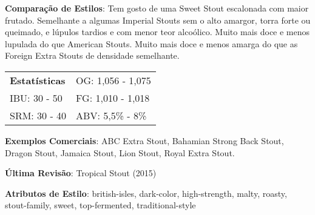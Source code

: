 \textbf{Comparação de Estilos}: Tem gosto de uma Sweet Stout escalonada com maior frutado. Semelhante a algumas Imperial Stouts sem o alto amargor, torra forte ou queimado, e lúpulos tardios e com menor teor alcoólico. Muito mais doce e menos lupulada do que American Stouts. Muito mais doce e menos amarga do que as Foreign Extra Stouts de densidade semelhante.

\begin{tabular}{@{}p{35mm}p{35mm}@{}}
  \textbf{Estatísticas} & OG: 1,056 - 1,075 \\
  IBU: 30 - 50  & FG: 1,010 - 1,018  \\
  SRM: 30 - 40  & ABV: 5,5\% - 8\%
\end{tabular}

\textbf{Exemplos Comerciais}: ABC Extra Stout, Bahamian Strong Back Stout, Dragon Stout, Jamaica Stout, Lion Stout, Royal Extra Stout.

\textbf{Última Revisão}: Tropical Stout (2015)

\textbf{Atributos de Estilo}: british-isles, dark-color, high-strength, malty, roasty, stout-family, sweet, top-fermented, traditional-style
